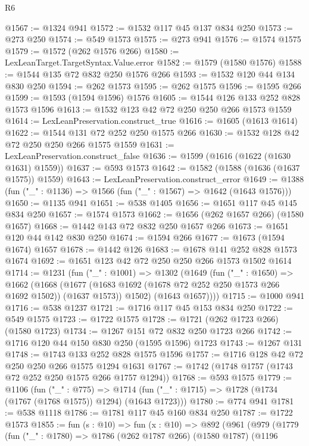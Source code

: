 \begin{lexlean}{R6}
\begin{coremodule}
{{{{{{{{{{{{{{{@1567 := @1324 @941
@1572 := @1532 @117 @45 @137 @834 @250
@1573 := @273 @250
@1574 := @549 @1573
@1575 := @273 @941
@1576 := @1574 @1575
@1579 := @1572 (@262 @1576 @266)
@1580 := LexLeanTarget.TargetSyntax.Value.error
@1582 := @1579 (@1580 @1576)
@1588 := @1544 @135 @72 @832 @250 @1576 @266
@1593 := @1532 @120 @44 @134 @830 @250
@1594 := @262 @1573
@1595 := @262 @1575
@1596 := @1595 @266
@1599 := @1593 (@1594 @1596) @1576
@1605 := @1544 @126 @133 @252 @828 @1573 @1596
@1613 := @1532 @123 @42 @72 @250 @250 @266 @1573 @1559
@1614 := LexLeanPreservation.construct_true
@1616 := @1605 (@1613 @1614)
@1622 := @1544 @131 @72 @252 @250 @1575 @266
@1630 := @1532 @128 @42 @72 @250 @250 @266 @1575 @1559
@1631 := LexLeanPreservation.construct_false
@1636 := @1599 (@1616 (@1622 (@1630 @1631) @1559))
@1637 := @593 @1573
@1642 := @1582 (@1588 (@1636 (@1637 @1575)) @1559)
@1643 := LexLeanPreservation.construct_error
@1649 := @1388 (fun ("_" : @1136) => @1566 (fun ("_" : @1567) => @1642 (@1643 @1576)))
@1650 := @1135 @941
@1651 := @538 @1405
@1656 := @1651 @117 @45 @145 @834 @250
@1657 := @1574 @1573
@1662 := @1656 (@262 @1657 @266) (@1580 @1657)
@1668 := @1442 @143 @72 @832 @250 @1657 @266
@1673 := @1651 @120 @44 @142 @830 @250
@1674 := @1594 @266
@1677 := @1673 (@1594 @1674) @1657
@1678 := @1442 @126
@1683 := @1678 @141 @252 @828 @1573 @1674
@1692 := @1651 @123 @42 @72 @250 @250 @266 @1573 @1502 @1614
@1714 := @1231
    (fun ("_" : @1001) =>
    @1302
      (@1649
        (fun ("_" : @1650) =>
        @1662
          (@1668
            (@1677 (@1683 @1692 (@1678 @72 @252 @250 @1573 @266 @1692 @1502)) (@1637 @1573))
            @1502)
          (@1643 @1657))))
@1715 := @1000 @941
@1716 := @538 @1237
@1721 := @1716 @117 @45 @153 @834 @250
@1722 := @549 @1575
@1723 := @1722 @1575
@1728 := @1721 (@262 @1723 @266) (@1580 @1723)
@1734 := @1267 @151 @72 @832 @250 @1723 @266
@1742 := @1716 @120 @44 @150 @830 @250 (@1595 @1596) @1723
@1743 := @1267 @131
@1748 := @1743 @133 @252 @828 @1575 @1596
@1757 := @1716 @128 @42 @72 @250 @250 @266 @1575 @1294 @1631
@1767 := @1742 (@1748 @1757 (@1743 @72 @252 @250 @1575 @266 @1757 @1294))
@1768 := @593 @1575
@1779 := @1106
    (fun ("_" : @775) =>
    @1714 (fun ("_" : @1715) => @1728 (@1734 (@1767 (@1768 @1575)) @1294) (@1643 @1723)))
@1780 := @774 @941
@1781 := @538 @1118
@1786 := @1781 @117 @45 @160 @834 @250
@1787 := @1722 @1573
@1855 := fun (s : @10) =>
  fun (x : @10) =>
  @892
    (@961
      (@979
        (@1779
          (fun ("_" : @1780) =>
          @1786
            (@262 @1787 @266)
            (@1580 @1787)
            (@1196
}}}}}}}}}}}}}}}
\end{coremodule}
\end{lexlean}
